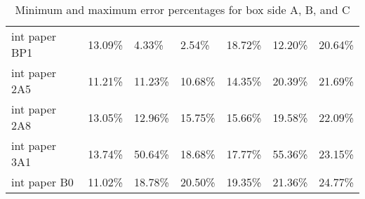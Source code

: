 \documentclass[11pt, twoside, reqno]{book}
\begin{document}
\begin{table}[]
\begin{tabular}{lllllll}
		int paper BP1       & 13.09\%       & 4.33\%        & 2.54\%        & 18.72\%       & 12.20\%       & 20.64\%       \\
		int paper 2A5       & 11.21\%       & 11.23\%       & 10.68\%       & 14.35\%       & 20.39\%       & 21.69\%       \\
		int paper 2A8       & 13.05\%       & 12.96\%       & 15.75\%       & 15.66\%       & 19.58\%       & 22.09\%       \\
		int paper 3A1       & 13.74\%       & 50.64\%       & 18.68\%       & 17.77\%       & 55.36\%       & 23.15\%       \\
		int paper B0        & 11.02\%       & 18.78\%       & 20.50\%       & 19.35\%       & 21.36\%       & 24.77\%      
	\end{tabular}
\caption{Minimum and maximum error percentages for box side A, B, and C}
\end{table}
\end{document}
